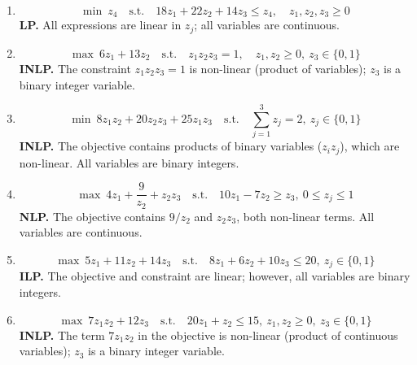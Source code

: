 \documentclass[12pt,a4paper]{article}
\begin{document}
\begin{enumerate}[label=(\alph*)]

\item
\[
\min\ z_4 \quad \text{s.t.} \quad 18z_1 + 22z_2 + 14z_3 \leq z_4, \quad z_1, z_2, z_3 \geq 0
\]
\textbf{LP.} All expressions are linear in $z_j$; all variables are continuous.

\item
\[
\max\ 6z_1 + 13z_2 \quad \text{s.t.} \quad z_1 z_2 z_3 = 1, \quad z_1, z_2 \geq 0,\ z_3 \in \{0,1\}
\]
\textbf{INLP.} The constraint $z_1 z_2 z_3 = 1$ is non-linear (product of variables); $z_3$ is a binary integer variable.

\item
\[
\min\ 8z_1z_2 + 20z_2z_3 + 25z_1z_3 \quad \text{s.t.} \quad \sum_{j=1}^{3} z_j = 2,\ z_j \in \{0,1\}
\]
\textbf{INLP.} The objective contains products of binary variables ($z_iz_j$), which are non-linear. All variables are binary integers.

\item
\[
\max\ 4z_1 + \frac{9}{z_2} + z_2 z_3 \quad \text{s.t.} \quad 10z_1 - 7z_2 \geq z_3,\ 0 \leq z_j \leq 1
\]
\textbf{NLP.} The objective contains $9/z_2$ and $z_2z_3$, both non-linear terms. All variables are continuous.

\item
\[
\max\ 5z_1 + 11z_2 + 14z_3 \quad \text{s.t.} \quad 8z_1 + 6z_2 + 10z_3 \leq 20,\ z_j \in \{0,1\}
\]
\textbf{ILP.} The objective and constraint are linear; however, all variables are binary integers.

\item
\[
\max\ 7z_1z_2 + 12z_3 \quad \text{s.t.} \quad 20z_1 + z_2 \leq 15,\ z_1, z_2 \geq 0,\ z_3 \in \{0,1\}
\]
\textbf{INLP.} The term $7z_1z_2$ in the objective is non-linear (product of continuous variables); $z_3$ is a binary integer variable.

\end{enumerate}
\end{document}

